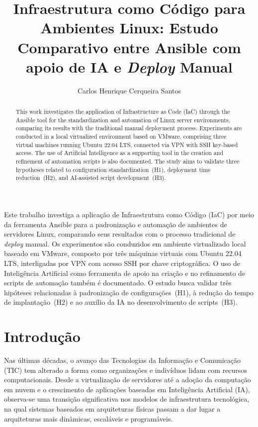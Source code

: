\documentclass[12pt]{article}
\title{Infraestrutura como Código para Ambientes Linux:
Estudo Comparativo entre Ansible com apoio de IA e \textit{Deploy}
Manual}
\author{Carlos Henrique Cerqueira Santos\inst{1}}
\begin{document}
\maketitle

\begin{abstract}
This work investigates the application of Infrastructure as Code (IaC) through the Ansible tool for the standardization and automation of Linux server environments, comparing its results with the traditional manual deployment process. Experiments are conducted in a local virtualized environment based on VMware, comprising three virtual machines running Ubuntu 22.04 LTS, connected via VPN with SSH key-based access. The use of Artificial Intelligence as a supporting tool in the creation and refinement of automation scripts is also documented. The study aims to validate three hypotheses related to configuration standardization~(H1), deployment time reduction~(H2), and AI-assisted script development~(H3).
\end{abstract}

\begin{resumo}
Este trabalho investiga a aplicação de Infraestrutura como Código (IaC) por meio da ferramenta Ansible para a padronização e automação de ambientes de servidores Linux, comparando seus resultados com o processo tradicional de \textit{deploy} manual. Os experimentos são conduzidos em ambiente virtualizado local baseado em VMware, composto por três máquinas virtuais com Ubuntu 22.04 LTS, interligadas por VPN com acesso SSH por chave criptográfica. O uso de Inteligência Artificial como ferramenta de apoio na criação e no refinamento de scripts de automação também é documentado. O estudo busca validar três hipóteses relacionadas à padronização de configurações~(H1), à redução do tempo de implantação~(H2) e ao auxílio da IA no desenvolvimento de scripts~(H3).
\end{resumo}

\section{Introdução}

Nas últimas décadas, o avanço das Tecnologias da Informação e Comunicação (TIC) tem alterado a forma como organizações e indivíduos lidam com recursos computacionais. Desde a virtualização de servidores até a adoção da computação em nuvem e o crescimento de aplicações baseadas em Inteligência Artificial (IA), observa-se uma transição significativa nos modelos de infraestrutura tecnológica, na qual sistemas baseados em arquiteturas físicas passam a dar lugar a arquiteturas mais dinâmicas, escaláveis e programáveis.
\end{document}
